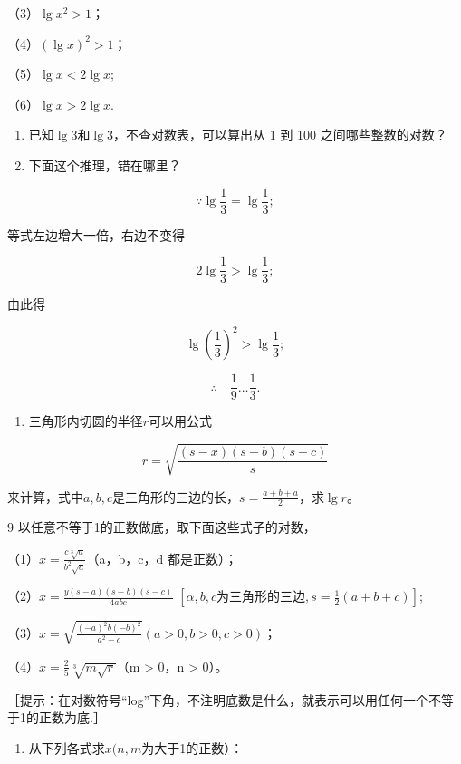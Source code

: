 （3）\(\lg x^{2} > 1\)；

（4）\((\lg x)^{2} > 1\)；

（5）\(\lg x < 2\lg x;\)

（6）\(\lg x > 2\lg x.\)

\begin{enumerate}[start=6]
\item
  已知\(\lg 3\)和\(\lg 3\)，不查对数表，可以算出从 1 到 100
  之间哪些整数的对数？
\item
  下面这个推理，错在哪里？
\end{enumerate}

\[
\because \lg \frac{1}{3} = \lg \frac{1}{3}; \tag {1}
\]

等式左边增大一倍，右边不变得

\[
2 \lg \frac{1}{3} > \lg \frac{1}{3}; \tag {2}
\]

由此得

\[
\lg \left(\frac{1}{3}\right)^{2} > \lg \frac{1}{3}; \tag {3}
\]

\[
\therefore \quad \frac{1}{9} \dots \frac{1}{3}. \tag {4}
\]

\begin{enumerate}[start=8]
\item
  三角形内切圆的半径\(r\)可以用公式
\end{enumerate}

\[
r = \sqrt{\frac{(s - x) (s - b) (s - c)}{s}}
\]

来计算，式中\(a, b, c\)是三角形的三边的长，\(s = \frac{a + b + a}{2}\)，求\(\lg r\)。

9 以任意不等于1的正数做底，取下面这些式子的对数，

（1）\(x = \frac{c\sqrt[3]{a}}{b^2\sqrt{a}}\)（a，b，c，d 都是正数）；

（2）\(x = \frac{y(s - a)(s - b)(s - c)}{4abc}\)
\(\left[\alpha, b, c \text{为三角形的三边}, s = \frac{1}{2}(a + b + c)\right];\)

（3）\(x = \sqrt{\frac{(-a)^2b(-b)^2}{a^2 - c}}\)\((a > 0, b > 0, c > 0)\)；

（4）\(x = \frac{2}{5}\sqrt[3]{m\sqrt{r}}\)（m \textgreater{} 0，n
\textgreater{} 0）。

［提示：在对数符号``log''下角，不注明底数是什么，就表示可以用任何一个不等于1的正数为底.］

\begin{enumerate}[start=10]
\item
  从下列各式求\(x(n, m\)为大于1的正数）：
\end{enumerate}

